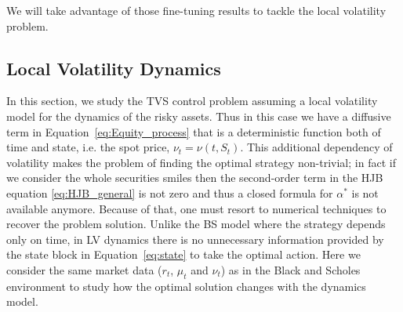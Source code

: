 \documentclass[runningheads]{m2ef}
\newcommand{\change}[1]{{\color{red} {#1}}}%
\begin{document}
We will take advantage of those fine-tuning results to tackle the local volatility problem.


\subsection{Local \change{V}olatility \change{D}ynamics}
In this section, we study the TVS control problem assuming a local volatility model for the dynamics of the risky assets. Thus in this case we have a diffusive term in Equation~\eqref{eq:Equity_process} that is a deterministic function both of time and state, i.e. the spot price, $\nu_t=\nu(t,S_t)$. This additional dependency of volatility makes the problem of finding the optimal strategy non-trivial; in fact if we consider the whole securities smiles then the second-order term in the HJB equation \eqref{eq:HJB_general} is not zero and thus a closed formula for $\alpha^*$ is not available anymore. Because of that, one must resort to numerical techniques to recover the problem solution. Unlike the BS model where the strategy depends only on time, in LV dynamics there is no unnecessary information provided by the state block in Equation~\eqref{eq:state} to take the optimal action. Here we consider the same market data ($r_t$, $\mu_t$ and $\nu_t$) as in the Black and Scholes environment to study how the optimal solution changes with the dynamics model. 
\end{document}
